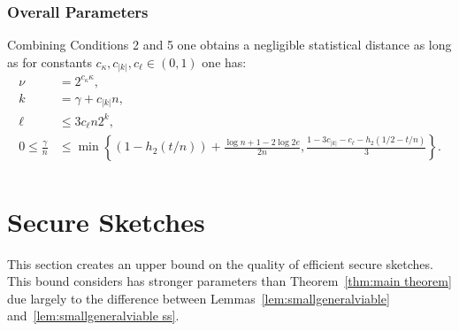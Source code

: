 \subsubsection{Overall Parameters}
Combining Conditions 2 and 5 one obtains a negligible statistical distance as long as for constants $c_\kappa, c_{|k|}, c_{\ell}\in (0,1)$ one has:
\begin{align*}
\nu &= 2^{c_{\kappa}\kappa},\\
k &=\gamma + c_{|k|}n,\\
\ell&\le 3c_{\ell}n2^k,\\
0\le \frac{\gamma}{n} &\le \min\left\{(1-h_2(t/n)) +\frac{\log{n}+1-2\log{2e}}{2n}, \frac{1-3c_{|k|} - c_{\ell}-h_2(1/2-t/n)}{3}\right\}.\\
\end{align*}
%
%


\section{Secure Sketches}
\label{sec:ss}
This section creates an upper bound on the quality of efficient secure sketches.  This bound considers has stronger parameters than Theorem~\ref{thm:main theorem} due largely to the difference between Lemmas~\ref{lem:smallgeneralviable} and~\ref{lem:smallgeneralviable ss}.


